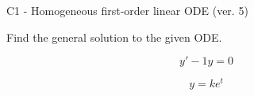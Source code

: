 \begin{exercise}
  \begin{exerciseTitle}C1 - Homogeneous first-order linear ODE (ver. 5)\end{exerciseTitle}
  \begin{exerciseStatement}
    
Find the general solution to the given ODE.

    
\[y'-1y=0\]

  \end{exerciseStatement}
  \begin{exerciseAnswer}
    
\[y= k e^{t}\]

  \end{exerciseAnswer}
\end{exercise}